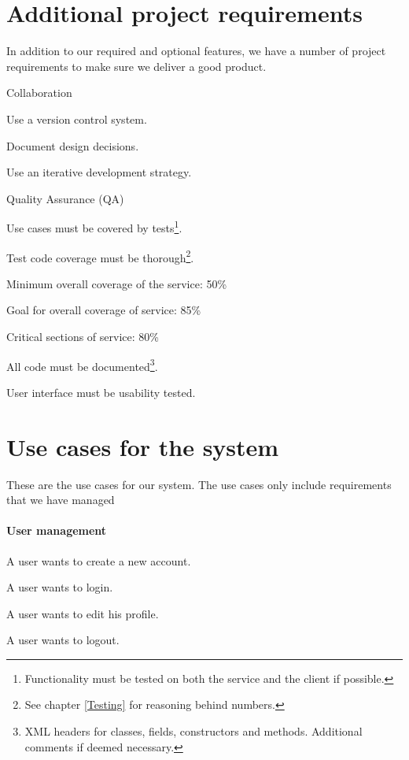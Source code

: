 \section{Additional project requirements}
\label{Requirements_Additional}
In addition to our required and optional features, we have a number of project requirements to make sure we deliver a good product. 
\begin{my_itemize}
	\item Collaboration 
	\begin{my_itemize}
		\item Use a version control system.
		\item Document design decisions.
		\item Use an iterative development strategy.
	\end{my_itemize}
	\item Quality Assurance (QA)
	\begin{my_itemize}
		\item Use cases must be covered by tests\footnote{Functionality must be tested on both the service and the client if possible.}.
		\item Test code coverage must be thorough\footnote{See chapter \ref{Testing}  for reasoning behind	numbers.}.
		\begin{my_itemize}
			\item Minimum overall coverage of the service: 50\%
			\item Goal for overall coverage of service: 85\%
			\item Critical sections of service: 80\%
		\end{my_itemize}
		\item All code must be documented\footnote{XML headers for classes, fields, constructors and methods. Additional comments if deemed necessary.}.
		\item User interface must be usability tested.
	\end{my_itemize}
\end{my_itemize}

\section{Use cases for the system}
\label{Requirements_UC}
These are the use cases for our system. The use cases only include requirements that we have managed
\paragraph{User management}
\begin{my_itemize}
	\item A user wants to create a new account.
	\item A user wants to login.
	\item A user wants to edit his profile.
	\item A user wants to logout.
\end{my_itemize}

